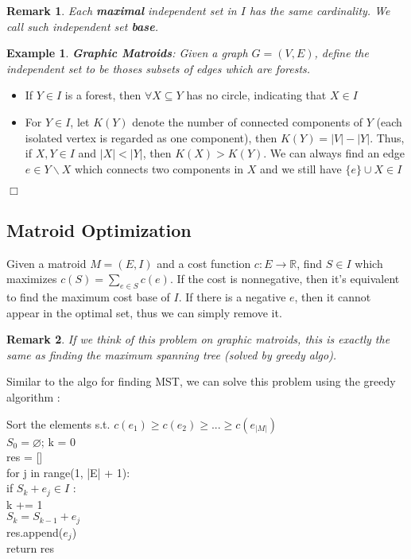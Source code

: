 \documentclass[11pt]{article}
\newtheorem{remark}{Remark}
\newtheorem{eg}{Example}
\newenvironment{proof}{\vspace{-0.05in}\noindent{\bf Proof:}}%
        {\hspace*{\fill}$\Box$\par}
\begin{document}
    \begin{remark}
      Each \textbf{maximal} independent set in $I$ has the same cardinality. We call such independent set \textbf{base}.
    \end{remark}

    \begin{eg}
      \textbf{Graphic Matroids}: Given a graph $G = (V, E)$, define the independent set to be thoses subsets of edges which are forests. 
    \end{eg}
    \begin{proof}
      \begin{itemize}
        \item If $Y \in I$ is a forest, then $\forall X \subseteq Y$ has no circle, indicating that $X \in I$
        \item For $Y \in I$, let $K(Y)$ denote the number of connected components of $Y$ (each isolated vertex is regarded as one component), then $K(Y) = |V| - |Y|$. Thus, if $X, Y \in I$ and $|X| < |Y|$, then $K(X) > K(Y)$. We can always find an edge $e \in Y \backslash X$ which connects two components in $X$ and we still have $\{e\} \cup X \in I$
      \end{itemize}
    \end{proof}

  \subsection{Matroid Optimization}
    Given a matroid $M = (E, I)$ and a cost function $c : E \rightarrow \mathbb{R}$, find $S \in I$ which maximizes $c(S) = \sum_{e \in S} c(e)$. If the cost is nonnegative, then it's equivalent to find the maximum cost base of $I$. If there is a negative $e$, then it cannot appear in the optimal set, thus we can simply remove it. 

    \begin{remark}
      If we think of this problem on graphic matroids, this is exactly the same as finding the maximum spanning tree (solved by greedy algo).
    \end{remark}

    Similar to the algo for finding MST, we can solve this problem using the greedy algorithm :

    \begin{algo}
      Sort the elements s.t. $c(e_1) \ge c(e_2) \ge ... \ge c(e_{|M|})$ \\
      $S_0 = \varnothing$; k = 0 \\
      res = []\\
      for j in range(1, |E| + 1): \\
        if $S_{k} + e_j \in I$ : \\
          k += 1 \\
          $S_k = S_{k - 1} + e_j$ \\
          res.append($e_j$) \\
      return res
    \end{algo}
\end{document}
